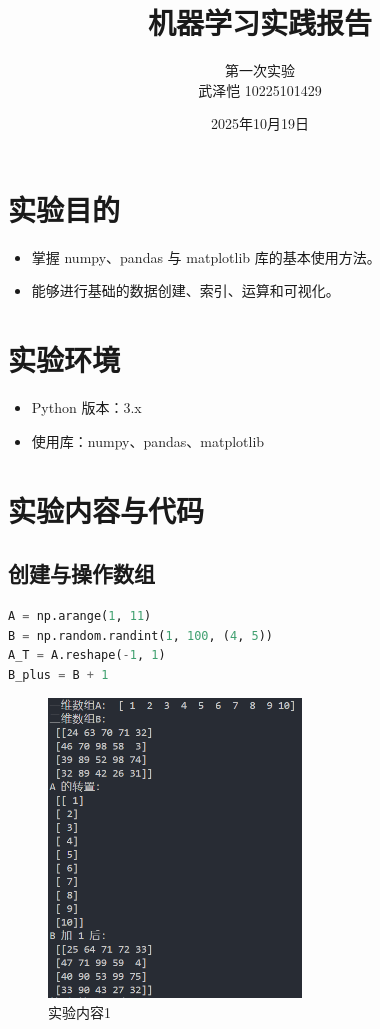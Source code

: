 \documentclass{article}
\title{\heiti\textbf{机器学习实践报告}}
\author{第一次实验 \\ 
武泽恺 10225101429
}
\date{2025年10月19日}
\begin{document}
\maketitle

\section{实验目的}
\begin{itemize}
  \item 掌握 numpy、pandas 与 matplotlib 库的基本使用方法。
  \item 能够进行基础的数据创建、索引、运算和可视化。
\end{itemize}

\section{实验环境}
\begin{itemize}
  \item Python 版本：3.x
  \item 使用库：numpy、pandas、matplotlib
\end{itemize}

\section{实验内容与代码}

\subsection{创建与操作数组}
\begin{lstlisting}[language=Python]
A = np.arange(1, 11)
B = np.random.randint(1, 100, (4, 5))
A_T = A.reshape(-1, 1)
B_plus = B + 1
\end{lstlisting}

\begin{figure}[H]
  \centering
  \includegraphics[width=0.6\textwidth]{image.png}
  \caption{实验内容1}
\end{figure}
\end{document}
